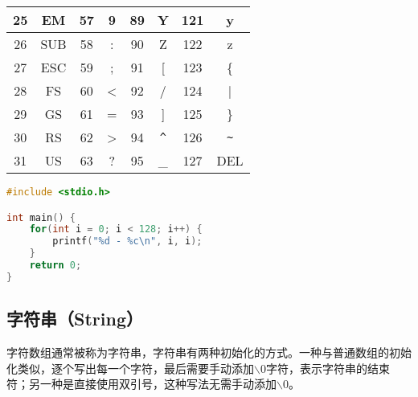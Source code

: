 \begin{longtable}{|c|c|c|c|c|c|c|c|}
	\hline
	25             & EM            & 57             & 9             & 89             & Y                      & 121            & y                      \\
	\hline
	26             & SUB           & 58             & :             & 90             & Z                      & 122            & z                      \\
	\hline
	27             & ESC           & 59             & ;             & 91             & [                      & 123            & \{                     \\
			\hline
	28             & FS            & 60             & <             & 92             & /                      & 124            & |                      \\
			\hline
	29             & GS            & 61             & =             & 93             & ]                      & 125            & \}                     \\
	\hline
	30             & RS            & 62             & >             & 94             & \lstinline|^| & 126            & \lstinline|~| \\
	\hline
	31             & US            & 63             & ?             & 95             & \_                     & 127            & DEL                    \\
	\hline
\end{longtable}

\vspace{0.5cm}


\begin{lstlisting}[language=C]
#include <stdio.h>

int main() {
	for(int i = 0; i < 128; i++) {
		printf("%d - %c\n", i, i);
	}
	return 0;
}
\end{lstlisting}

\vspace{0.5cm}

\subsection{字符串（String）}

字符数组通常被称为字符串，字符串有两种初始化的方式。一种与普通数组的初始化类似，逐个写出每一个字符，最后需要手动添加$ \backslash $0字符，表示字符串的结束符；另一种是直接使用双引号，这种写法无需手动添加$ \backslash $0。
\vspace{-0.5cm}

